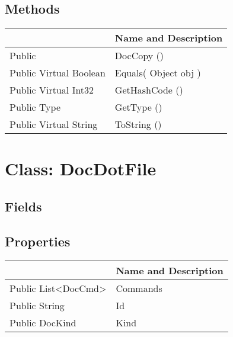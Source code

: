 \documentclass[11pt, oneside, a4paper]{book}
\begin{document}
\subsection{Methods}
\begin{center}
\begin{tabular}{| p{3cm} | p{12cm} | }
\hline
\textbf{ } & \textbf{ Name and Description}\\
\hline
 Public  &  DocCopy ()\hypertarget{SoftwareEngineeringTools.{}Documentation.{}DocCopy.{}DocCopy}{}\\
\hline
 Public  Virtual  Boolean &  Equals(\hypertarget{SoftwareEngineeringTools.{}Documentation.{}DocCopy.{}Equals\_Object}{} Object  obj  )\\
\hline
 Public  Virtual  Int32 &  GetHashCode ()\hypertarget{SoftwareEngineeringTools.{}Documentation.{}DocCopy.{}GetHashCode}{}\\
\hline
 Public  Type &  GetType ()\hypertarget{SoftwareEngineeringTools.{}Documentation.{}DocCopy.{}GetType}{}\\
\hline
 Public  Virtual  String &  ToString ()\hypertarget{SoftwareEngineeringTools.{}Documentation.{}DocCopy.{}ToString}{}\\
\hline
\end{tabular}
\end{center}
 


\hypertarget{SoftwareEngineeringTools.{}Documentation.{}DocDotFile}{}
\section{Class: DocDotFile}

\subsection{Fields}

\subsection{Properties}
\begin{center}
\begin{tabular}{| p{3cm} | p{12cm} | }
\hline
\textbf{ } & \textbf{ Name and Description}\\
\hline
 Public  List<DocCmd> &  Commands\hypertarget{SoftwareEngineeringTools.{}Documentation.{}DocDotFile.{}Commands}{}\\
\hline
 Public  String &  Id\hypertarget{SoftwareEngineeringTools.{}Documentation.{}DocDotFile.{}Id}{}\\
\hline
 Public  DocKind &  Kind\hypertarget{SoftwareEngineeringTools.{}Documentation.{}DocDotFile.{}Kind}{}\\
\hline
\end{tabular}
\end{center}
\end{document}
